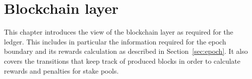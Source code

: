 \section{Blockchain layer}
\label{sec:chain}

\newcommand{\Proof}{\type{Proof}}
\newcommand{\Seedl}{\mathsf{Seed}_\ell}
\newcommand{\Seede}{\mathsf{Seed}_\eta}
\newcommand{\StartRewards}{\ensuremath{\mathsf{StartRewards}}}
\newcommand{\activeSlotCoeff}[1]{\fun{activeSlotCoeff}~ \var{#1}}
\newcommand{\slotToSeed}[1]{\fun{slotToSeed}~ \var{#1}}

\newcommand{\T}{\type{T}}
\newcommand{\vrf}[3]{\fun{vrf}_{#1} ~ #2 ~ #3}
\newcommand{\verifyVrf}[4]{\fun{verifyVrf}_{#1} ~ #2 ~ #3 ~#4}

\newcommand{\HashHeader}{\type{HashHeader}}
\newcommand{\HashBBody}{\type{HashBBody}}
\newcommand{\bhHash}[1]{\fun{bhHash}~ \var{#1}}
\newcommand{\bHeaderSize}[1]{\fun{bHeaderSize}~ \var{#1}}
\newcommand{\bSize}[1]{\fun{bSize}~ \var{#1}}
\newcommand{\bBodySize}[1]{\fun{bBodySize}~ \var{#1}}
\newcommand{\OCert}{\type{OCert}}
\newcommand{\BHeader}{\type{BHeader}}
\newcommand{\BHBody}{\type{BHBody}}

\newcommand{\bheader}[1]{\fun{bheader}~\var{#1}}
\newcommand{\hsig}[1]{\fun{hsig}~\var{#1}}
\newcommand{\bprev}[1]{\fun{bprev}~\var{#1}}
\newcommand{\bhash}[1]{\fun{bhash}~\var{#1}}
\newcommand{\bvkcold}[1]{\fun{bvkcold}~\var{#1}}
\newcommand{\bseedl}[1]{\fun{bseed}_{\ell}~\var{#1}}
\newcommand{\bprfn}[1]{\fun{bprf}_{n}~\var{#1}}
\newcommand{\bseedn}[1]{\fun{bseed}_{n}~\var{#1}}
\newcommand{\bprfl}[1]{\fun{bprf}_{\ell}~\var{#1}}
\newcommand{\bocert}[1]{\fun{bocert}~\var{#1}}
\newcommand{\bnonce}[1]{\fun{bnonce}~\var{#1}}
\newcommand{\bleader}[1]{\fun{bleader}~\var{#1}}
\newcommand{\hBbsize}[1]{\fun{hBbsize}~\var{#1}}
\newcommand{\bbodyhash}[1]{\fun{bbodyhash}~\var{#1}}
\newcommand{\overlaySchedule}[3]{\fun{overlaySchedule}~\var{#1}~{#2}~\var{#3}}

\newcommand{\PrtclState}{\type{PrtclState}}
\newcommand{\PrtclEnv}{\type{PrtclEnv}}
\newcommand{\OverlayEnv}{\type{OverlayEnv}}
\newcommand{\VRFState}{\type{VRFState}}
\newcommand{\NewEpochEnv}{\type{NewEpochEnv}}
\newcommand{\NewEpochState}{\type{NewEpochState}}
\newcommand{\PoolDistr}{\type{PoolDistr}}
\newcommand{\BBodyEnv}{\type{BBodyEnv}}
\newcommand{\BBodyState}{\type{BBodyState}}
\newcommand{\RUpdEnv}{\type{RUpdEnv}}
\newcommand{\ChainEnv}{\type{ChainEnv}}
\newcommand{\ChainState}{\type{ChainState}}
\newcommand{\ChainSig}{\type{ChainSig}}


This chapter introduces the view of the blockchain layer as required for the
ledger. This includes in particular the information required for the epoch
boundary and its rewards calculation as described in Section~\ref{sec:epoch}. It
also covers the transitions that keep track of produced blocks in order to
calculate rewards and penalties for stake pools.

